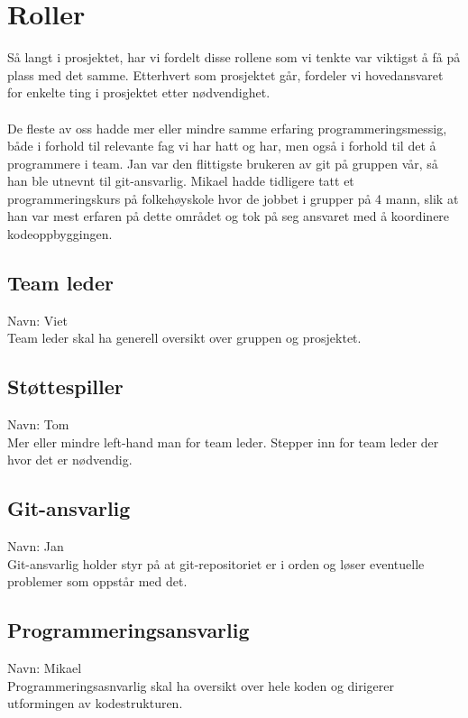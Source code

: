\documentclass{article}
\begin{document}
\maketitle

\section*{Roller}
Så langt i prosjektet, har vi fordelt disse rollene som vi tenkte var viktigst å få på plass med det samme. Etterhvert som prosjektet går, fordeler
vi hovedansvaret for enkelte ting i prosjektet etter nødvendighet.\\\\
De fleste av oss hadde mer eller mindre samme erfaring programmeringsmessig, både i forhold til relevante fag vi har hatt og har, men også i forhold til det å programmere i team. Jan var den flittigste brukeren av git på gruppen vår, så han ble utnevnt til git-ansvarlig. Mikael hadde tidligere tatt et programmeringskurs på folkehøyskole hvor de jobbet i grupper på 4 mann, slik at han var mest erfaren på dette området og tok på seg ansvaret med å koordinere kodeoppbyggingen.
\subsection*{Team leder}
Navn: Viet\\
Team leder skal ha generell oversikt over gruppen og prosjektet.

\subsection*{Støttespiller}
Navn: Tom\\
Mer eller mindre left-hand man for team leder. Stepper inn for team leder der hvor det er nødvendig.

\subsection*{Git-ansvarlig}
Navn: Jan\\
Git-ansvarlig holder styr på at git-repositoriet er i orden og løser eventuelle problemer som oppstår med det.

\subsection*{Programmeringsansvarlig}
Navn: Mikael\\
Programmeringsasnvarlig skal ha oversikt over hele koden og dirigerer utformingen av kodestrukturen.
\end{document}
